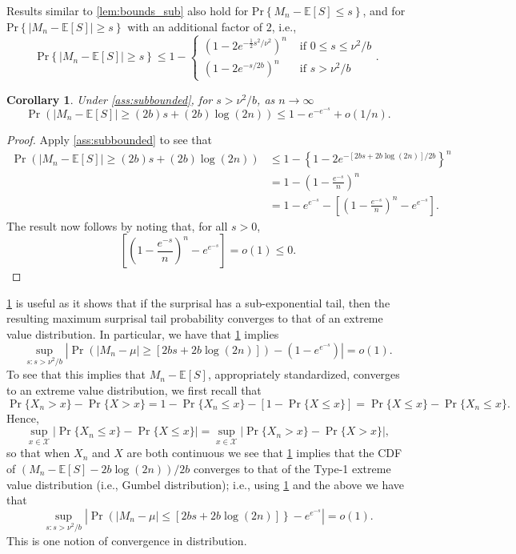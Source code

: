 \documentclass[a4paper,11pt]{article}
\newcommand{\E}{\mathbb{E}}
\newtheorem{corollary}{Corollary}
\begin{document}
Results similar to \cref{lem:bounds_sub} also hold for $\mathrm{Pr}\left\{M_n-\E[S]\le s\right\}$, and for $\mathrm{Pr}\left\{|M_n-\E[S]|\ge s\right\}$ with an additional factor of $2$, i.e.,
$$
	\mathrm{Pr}\left\{|M_n-\E[S]|\ge s\right\}\le 1-
	\begin{cases}
		(1-2e^{-\frac{1}{2}s^2/\nu^2})^n & \text{ if }0\le s\le \nu^2/b \\
		(1-2e^{-s/2b})^n                 & \text{ if }s>\nu^2/b
	\end{cases}.
$$

\begin{corollary}\label{cor:two}
	Under \cref{ass:subbounded}, for $s>\nu^2/b$, as $n\rightarrow\infty$
	$$
		\Pr\left(|M_n-\E[S]|\ge (2b)s+(2b)\log(2n)\right)\le 1-e^{-e^{-s}}+o(1/n).
	$$
\end{corollary}
\begin{proof}
	Apply \cref{ass:subbounded} to see that
	\begin{align*}
		\Pr\left(|M_n-\E[S]|\ge (2b)s+(2b)\log(2n)\right)
		 & \le 1- \left\{1-2e^{-[2bs+2b\log(2n)]/2b}\right\}^n                       \\
		 & = 1-\left(1-\frac{e^{-s}}{n}\right)^n                                     \\
		 & = 1-e^{e^{-s}}-\left[\left(1-\frac{e^{-s}}{n}\right)^n-e^{e^{-s}}\right].
	\end{align*}
	The result now follows by noting that, for all $s>0$,
	$$
		\left[\left(1-\frac{e^{-s}}{n}\right)^n-e^{e^{-s}}\right]= o(1)\le 0.
	$$
\end{proof}
\cref{cor:two} is useful as it shows that if the surprisal has a sub-exponential tail, then the resulting maximum surprisal tail probability converges to that of an extreme value distribution. In particular, we have that \cref{cor:two} implies
$$
	\sup_{s:s>\nu^2/b}\left|\Pr\left(|M_n-\mu|\ge [2bs+2b\log(2n)]\right)-\left(1-e^{e^{-s}}\right)\right|=o(1).
$$
To see that this implies that $M_n-\E[S]$, appropriately standardized, converges to an extreme value distribution, we first recall that
$$
	\Pr\{X_n>x\}-\Pr\{X>x\}=1-\Pr\{X_n\le x\}-\left[1-\Pr\{X\le x\}\right]=\Pr\{X\le x\}-\Pr\{X_n\le x\}.
$$
Hence,
$$
	\sup_{x\in\mathcal{X}}|\Pr\{X_n\le x\}-\Pr\{X\le x\}|=\sup_{x\in\mathcal{X}}|\Pr\{X_n> x\}-\Pr\{X> x\}|,
$$
so that when $X_n$ and $X$ are both continuous we see that \cref{cor:two} implies that the CDF of $(M_n-\E[S]-2b\log(2n))/2b$ converges to that of the Type-1 extreme value distribution (i.e., Gumbel distribution); i.e., using \cref{cor:two} and the above we have that
$$
	\sup_{s:s>\nu^2/b}\left|\Pr\left(|M_n-\mu|\le [2bs+2b\log(2n)]\right\}-e^{e^{-s}}\right|=o(1).
$$
This is one notion of convergence in distribution.
\end{document}
